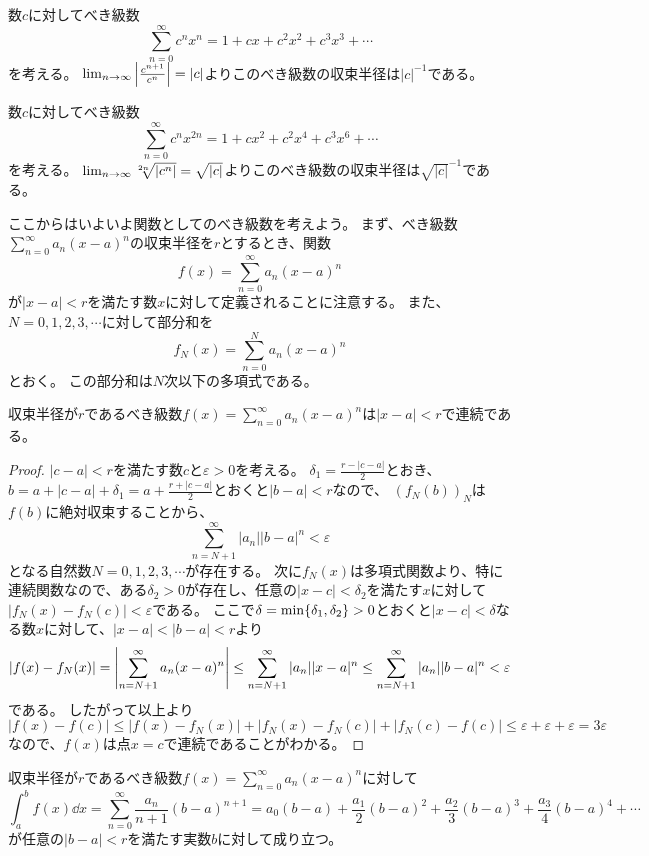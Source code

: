 \begin{example}
数$c$に対してべき級数
$$
\sum_{n = 0}^\infty c^n x^n = 1+c x+c^2 x^2+c^3 x^3+\cdots
$$
を考える。
$\lim_{n \to \infty}\abs{\frac{c^{n+1}}{c^n}} = |c|$よりこのべき級数の収束半径は$|c|^{-1}$である。
\end{example}

\begin{example}
数$c$に対してべき級数
$$
\sum_{n = 0}^\infty c^n x^{2 n} = 1+c x^2+c^2 x^4+c^3 x^6+\cdots
$$
を考える。
$\lim_{n \to \infty}\sqrt[2 n]{\abs{c^n}} = \sqrt{|c|}$よりこのべき級数の収束半径は$\sqrt{|c|}^{-1}$である。
\end{example}

ここからはいよいよ関数としてのべき級数を考えよう。
まず、べき級数$\sum_{n = 0}^\infty a_n(x-a)^n$の収束半径を$r$とするとき、関数
$$
f(x) = \sum_{n = 0}^\infty a_n(x-a)^n
$$
が$|x-a| < r$を満たす数$x$に対して定義されることに注意する。
また、$N = 0, 1, 2, 3, \cdots$に対して部分和を
$$
f_N(x) = \sum_{n = 0}^N a_n(x-a)^n
$$
とおく。
この部分和は$N$次以下の多項式である。

\begin{theorem}[べき級数の連続性]
収束半径が$r$であるべき級数$f(x) = \sum_{n = 0}^\infty a_n(x-a)^n$は$|x-a| < r$で連続である。
\end{theorem}

\begin{proof}
$|c-a| < r$を満たす数$c$と$\varepsilon > 0$を考える。
$\delta_1 = \frac{r-|c-a|}{2}$とおき、$b = a+|c-a|+\delta_1 = a+\frac{r+|c-a|}{2}$とおくと$|b-a| < r$なので、
$(f_N(b))_N$は$f(b)$に絶対収束することから、
$$
\sum_{n = N+1}^\infty |a_n||b-a|^n < \varepsilon
$$
となる自然数$N = 0, 1, 2, 3, \cdots$が存在する。
次に$f_N(x)$は多項式関数より、特に連続関数なので、ある$\delta_2 > 0$が存在し、任意の$|x-c| < \delta_2$を満たす$x$に対して$|f_N(x)-f_N(c)| < \varepsilon$である。
ここで$\delta = \min\{ \delta_1, \delta_2 \} > 0$とおくと$|x-c| < \delta$なる数$x$に対して、$|x-a| < |b-a| < r$より
$$
|f(x)-f_N(x)| = \abs{\sum_{n = N+1}^\infty a_n(x-a)^n} \le \sum_{n = N+1}^\infty |a_n||x-a|^n \le \sum_{n = N+1}^\infty |a_n||b-a|^n < \varepsilon
$$
である。
したがって以上より
$$
|f(x)-f(c)| \le |f(x)-f_N(x)|+|f_N(x)-f_N(c)|+|f_N(c)-f(c)|
\le \varepsilon+\varepsilon+\varepsilon = 3\varepsilon
$$
なので、$f(x)$は点$x = c$で連続であることがわかる。
\end{proof}

\begin{theorem}[べき級数の項別積分]
収束半径が$r$であるべき級数$f(x) = \sum_{n = 0}^\infty a_n(x-a)^n$に対して
$$
\int_a^b f(x)\dd{x} = \sum_{n = 0}^\infty \frac{a_n}{n+1}(b-a)^{n+1} = a_0(b-a)+\frac{a_1}{2}(b-a)^2+\frac{a_2}{3}(b-a)^3+\frac{a_3}{4}(b-a)^4+\cdots
$$
が任意の$|b-a| < r$を満たす実数$b$に対して成り立つ。
\end{theorem}

